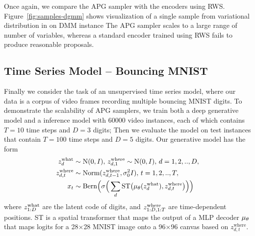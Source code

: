 \documentclass{article}
\theoremstyle{definition}
\begin{document}
Once again, we compare the APG sampler with the encoders using RWS. Figure~\ref{fig:samples-dgmm} shows visualization of a single sample from variational distribution in on DMM instance The APG sampler scales to a large range of number of variables, whereas a standard encoder trained using RWS fails to produce reasonable proposals.

\subsection{Time Series Model -- Bouncing MNIST}

Finally we consider the task of an unsupervised time series model, where our data is a corpus of video frames recording multiple bouncing MNIST digits. To demonstrate the scalability of APG samplers, we train both a deep generative model and a inference model with $60000$ video instances, each of which contains $T=10$ time steps and $D=3$ digits; Then we evaluate the model on test instances that contain $T=100$ time steps and $D=5$ digits. Our generative model has the form
\begin{align*}
    z^{\mathrm{what}}_{d} 
    &\sim 
    \text{N}(0, I)
    ,
    \,
    z^{\mathrm{where}}_{d, 1} \sim \text{N}(0, I)
    ,
    \,
    d=1, 2,.., D,
    \\
    z^{\mathrm{where}}_{d, t} 
    &\sim 
    \text{Norm}(z^{\mathrm{where}}_{d, t - 1}, \sigma^2_0 I),
    \,
    t=1, 2,.., T,   
    \\
    x_t 
    &\sim
    \mathrm{Bern}
    \Big(
        \sigma
        \Big(
            \sum_{d} \mathrm{ST}
            \big(
                \mu_\theta(z^{\mathrm{what}}_d), 
                z^{\mathrm{where}}_{d, t}
            \big)
        \Big)
    \Big)
\end{align*}
where $z_{1:D}^{\mathrm{what}}$ are the latent code of digits, and $z_{1:D, 1:T}^{\mathrm{where}}$ are time-dependent positions. ST is a spatial transformer \cite{jaderberg2015spatial} that maps the output of a MLP decoder $\mu_\theta$ that maps logits for a 28$\times$28 MNIST image onto a 96$\times$96 canvas based on $z^{\mathrm{where}}_{d, t}$. 
\end{document}
